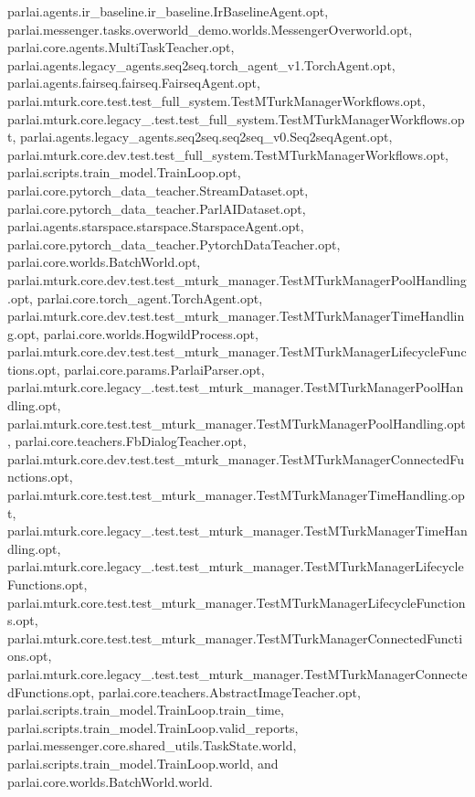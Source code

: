 parlai.\+agents.\+ir\+\_\+baseline.\+ir\+\_\+baseline.\+Ir\+Baseline\+Agent.\+opt, parlai.\+messenger.\+tasks.\+overworld\+\_\+demo.\+worlds.\+Messenger\+Overworld.\+opt, parlai.\+core.\+agents.\+Multi\+Task\+Teacher.\+opt, parlai.\+agents.\+legacy\+\_\+agents.\+seq2seq.\+torch\+\_\+agent\+\_\+v1.\+Torch\+Agent.\+opt, parlai.\+agents.\+fairseq.\+fairseq.\+Fairseq\+Agent.\+opt, parlai.\+mturk.\+core.\+test.\+test\+\_\+full\+\_\+system.\+Test\+M\+Turk\+Manager\+Workflows.\+opt, parlai.\+mturk.\+core.\+legacy\+\_.\+test.\+test\+\_\+full\+\_\+system.\+Test\+M\+Turk\+Manager\+Workflows.\+opt, parlai.\+agents.\+legacy\+\_\+agents.\+seq2seq.\+seq2seq\+\_\+v0.\+Seq2seq\+Agent.\+opt, parlai.\+mturk.\+core.\+dev.\+test.\+test\+\_\+full\+\_\+system.\+Test\+M\+Turk\+Manager\+Workflows.\+opt, parlai.\+scripts.\+train\+\_\+model.\+Train\+Loop.\+opt, parlai.\+core.\+pytorch\+\_\+data\+\_\+teacher.\+Stream\+Dataset.\+opt, parlai.\+core.\+pytorch\+\_\+data\+\_\+teacher.\+Parl\+A\+I\+Dataset.\+opt, parlai.\+agents.\+starspace.\+starspace.\+Starspace\+Agent.\+opt, parlai.\+core.\+pytorch\+\_\+data\+\_\+teacher.\+Pytorch\+Data\+Teacher.\+opt, parlai.\+core.\+worlds.\+Batch\+World.\+opt, parlai.\+mturk.\+core.\+dev.\+test.\+test\+\_\+mturk\+\_\+manager.\+Test\+M\+Turk\+Manager\+Pool\+Handling.\+opt, parlai.\+core.\+torch\+\_\+agent.\+Torch\+Agent.\+opt, parlai.\+mturk.\+core.\+dev.\+test.\+test\+\_\+mturk\+\_\+manager.\+Test\+M\+Turk\+Manager\+Time\+Handling.\+opt, parlai.\+core.\+worlds.\+Hogwild\+Process.\+opt, parlai.\+mturk.\+core.\+dev.\+test.\+test\+\_\+mturk\+\_\+manager.\+Test\+M\+Turk\+Manager\+Lifecycle\+Functions.\+opt, parlai.\+core.\+params.\+Parlai\+Parser.\+opt, parlai.\+mturk.\+core.\+legacy\+\_.\+test.\+test\+\_\+mturk\+\_\+manager.\+Test\+M\+Turk\+Manager\+Pool\+Handling.\+opt, parlai.\+mturk.\+core.\+test.\+test\+\_\+mturk\+\_\+manager.\+Test\+M\+Turk\+Manager\+Pool\+Handling.\+opt, parlai.\+core.\+teachers.\+Fb\+Dialog\+Teacher.\+opt, parlai.\+mturk.\+core.\+dev.\+test.\+test\+\_\+mturk\+\_\+manager.\+Test\+M\+Turk\+Manager\+Connected\+Functions.\+opt, parlai.\+mturk.\+core.\+test.\+test\+\_\+mturk\+\_\+manager.\+Test\+M\+Turk\+Manager\+Time\+Handling.\+opt, parlai.\+mturk.\+core.\+legacy\+\_.\+test.\+test\+\_\+mturk\+\_\+manager.\+Test\+M\+Turk\+Manager\+Time\+Handling.\+opt, parlai.\+mturk.\+core.\+legacy\+\_.\+test.\+test\+\_\+mturk\+\_\+manager.\+Test\+M\+Turk\+Manager\+Lifecycle\+Functions.\+opt, parlai.\+mturk.\+core.\+test.\+test\+\_\+mturk\+\_\+manager.\+Test\+M\+Turk\+Manager\+Lifecycle\+Functions.\+opt, parlai.\+mturk.\+core.\+test.\+test\+\_\+mturk\+\_\+manager.\+Test\+M\+Turk\+Manager\+Connected\+Functions.\+opt, parlai.\+mturk.\+core.\+legacy\+\_.\+test.\+test\+\_\+mturk\+\_\+manager.\+Test\+M\+Turk\+Manager\+Connected\+Functions.\+opt, parlai.\+core.\+teachers.\+Abstract\+Image\+Teacher.\+opt, parlai.\+scripts.\+train\+\_\+model.\+Train\+Loop.\+train\+\_\+time, parlai.\+scripts.\+train\+\_\+model.\+Train\+Loop.\+valid\+\_\+reports, parlai.\+messenger.\+core.\+shared\+\_\+utils.\+Task\+State.\+world, parlai.\+scripts.\+train\+\_\+model.\+Train\+Loop.\+world, and parlai.\+core.\+worlds.\+Batch\+World.\+world.



